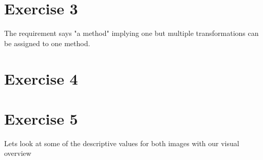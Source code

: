 \documentclass[12pt, a4paper]{article}
\begin{document}
\begin{multicols}{2}
    \newline

    \section{Exercise 3} \label{sec:ex3}

    The requirement says "a method" implying one but multiple transformations can be assigned to one method.
    \newline

    \begin{table}[H]
        \caption{Method Proposals}\label{tab:proposals3}
        \begin{center}
        \end{center}
    \end{table}

    \newline

    \section{Exercise 4} \label{sec:ex4}
    \section{Exercise 5} \label{sec:ex5}

    Lets look at some of the descriptive values for both images with our visual overview
    \newline

    \begin{table}[H]
        \caption{Comparison of Image\_1 and Image\_2}\label{tab:comparison}
        \begin{center}
        \end{center}
    \end{table}


\end{multicols}
\end{document}
